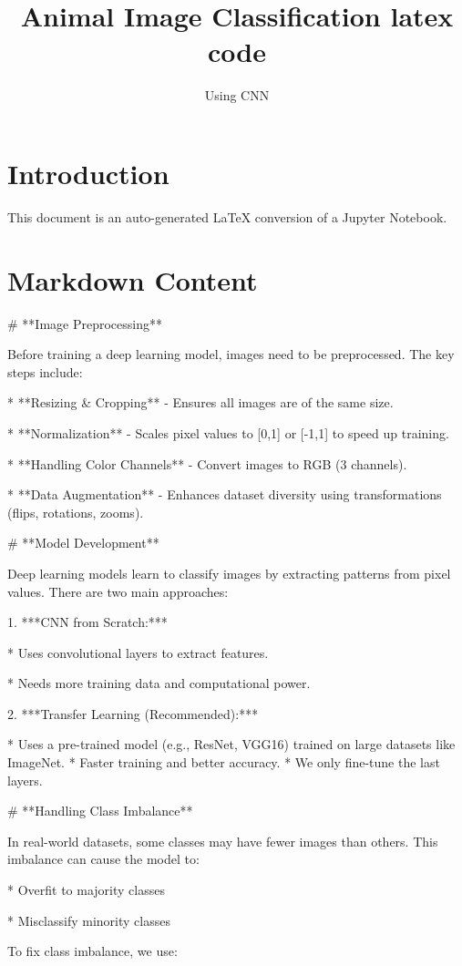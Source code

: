 \documentclass{article}
\title{Animal Image Classification latex code}
\author{Using CNN}
\date{}
\begin{document}
\maketitle

\section{Introduction}
This document is an auto-generated LaTeX conversion of a Jupyter Notebook.

\section{Markdown Content}
# **Image Preprocessing**

Before training a deep learning model, images need to be preprocessed. The key steps include:

*  **Resizing & Cropping** - Ensures all images are of the same size.

*  **Normalization** - Scales pixel values to [0,1] or [-1,1] to speed up training.

*  **Handling Color Channels** - Convert images to RGB (3 channels).

*  **Data Augmentation** - Enhances dataset diversity using transformations (flips, rotations, zooms).

# **Model Development**

Deep learning models learn to classify images by extracting patterns from pixel values. There are two main approaches:

1. ***CNN from Scratch:***

*  Uses convolutional layers to extract features.

*  Needs more training data and computational power.

2.  ***Transfer Learning (Recommended):***

*  Uses a pre-trained model (e.g., ResNet, VGG16) trained on large datasets like ImageNet.
*  Faster training and better accuracy.
*  We only fine-tune the last layers.

# **Handling Class Imbalance**

In real-world datasets, some classes may have fewer images than others. This imbalance can cause the model to:

*  Overfit to majority classes

*  Misclassify minority classes

To fix class imbalance, we use:
\end{document}
